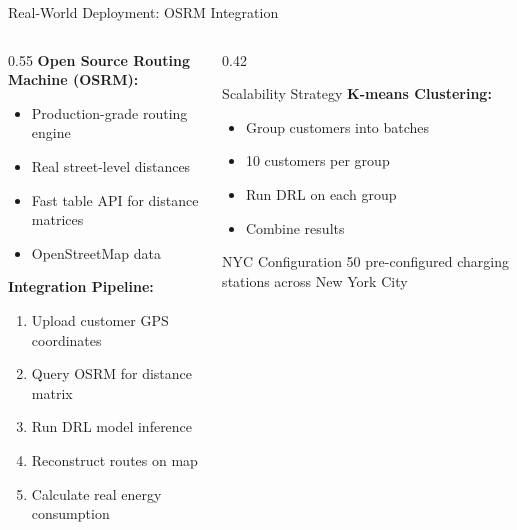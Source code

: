 \documentclass[aspectratio=169,11pt]{beamer}
\begin{document}
\begin{frame}{Real-World Deployment: OSRM Integration}
    \begin{columns}[T]
        \begin{column}{0.55\textwidth}
            \textbf{Open Source Routing Machine (OSRM):}
            \begin{itemize}
                \item Production-grade routing engine
                \item Real street-level distances
                \item Fast table API for distance matrices
                \item OpenStreetMap data
            \end{itemize}
            
            \vspace{0.3cm}
            \textbf{Integration Pipeline:}
            \begin{enumerate}
                \item Upload customer GPS coordinates
                \item Query OSRM for distance matrix
                \item Run DRL model inference
                \item Reconstruct routes on map
                \item Calculate real energy consumption
            \end{enumerate}
        \end{column}
        \begin{column}{0.42\textwidth}
            \begin{block}{Scalability Strategy}
                \textbf{K-means Clustering:}
                \begin{itemize}
                    \item Group customers into batches
                    \item 10 customers per group
                    \item Run DRL on each group
                    \item Combine results
                \end{itemize}
            \end{block}
            
            \begin{exampleblock}{NYC Configuration}
                50 pre-configured charging stations across New York City
            \end{exampleblock}
        \end{column}
    \end{columns}
\end{frame}
\end{document}
